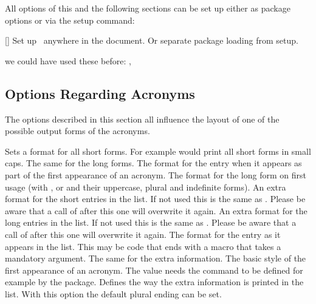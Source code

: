 \documentclass[load-preamble+,scrartcl={DIV10}]{cnltx-doc}
\begin{document}
All options of this and the following sections can be set up either as package
options or via the setup command:
\begin{commands}
  []
   Set up \acro\ anywhere in the document.  Or separate package loading from
   setup.
\end{commands}

\begin{example}
  we could have used these before: \nato, \ny
\end{example}

\subsection{Options Regarding Acronyms}
The options described in this section all influence the layout of one of the
possible output forms of the acronyms.
\begin{options}
  \Default
    Sets a format for all short forms. For example
     would print all short forms in small
    caps.
  \Default
    The same for the long forms.
  \Default
    The format for the  entry when it appears as part of the
    first appearance of an acronym.
  \Default
    The format for the long form on first usage (with ,  or
     and their uppercase, plural and indefinite forms).
  \Default
    An extra format for the short entries in the list.  If
    not used this is the same as .  Please be aware that
    a call of  after this one will overwrite it again.
  \Default
    An extra format for the long entries in the list.  If not used this is the
    same as .  Please be aware that a call of
     after this one will overwrite it again.
    \label{key:list-foreign-format}The format for the  entry
    as it appears in the list.  This may be code that ends with a macro that
    takes a mandatory argument.
  \Default
    The same for the extra information.
    The basic style of the first appearance of an
    acronym.  The value  needs the command  to be
    defined for example by the  package.
    Defines the way the extra information is printed in the list.
    With this option the default plural ending can be set.
\end{options}
 
\end{document}
